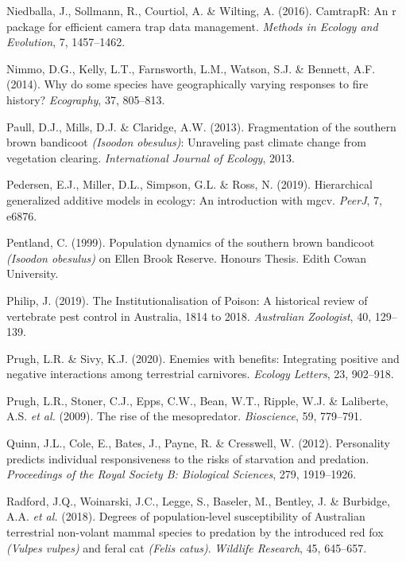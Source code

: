 \documentclass[11pt,a4paper,titlepage,twoside,openright]{style/unimelbthesis}
\begin{document}
\begin{mainmatter}
\leavevmode\hypertarget{ref-niedballa2016}{}%
Niedballa, J., Sollmann, R., Courtiol, A. \& Wilting, A. (2016). CamtrapR: An r package for efficient camera trap data management. \emph{Methods in Ecology and Evolution}, 7, 1457--1462.

\leavevmode\hypertarget{ref-nimmo2014why}{}%
Nimmo, D.G., Kelly, L.T., Farnsworth, L.M., Watson, S.J. \& Bennett, A.F. (2014). Why do some species have geographically varying responses to fire history? \emph{Ecography}, 37, 805--813.

\leavevmode\hypertarget{ref-paull2013fragmentation}{}%
Paull, D.J., Mills, D.J. \& Claridge, A.W. (2013). Fragmentation of the southern brown bandicoot \emph{(Isoodon obesulus)}: Unraveling past climate change from vegetation clearing. \emph{International Journal of Ecology}, 2013.

\leavevmode\hypertarget{ref-pedersen2019hierarchical}{}%
Pedersen, E.J., Miller, D.L., Simpson, G.L. \& Ross, N. (2019). Hierarchical generalized additive models in ecology: An introduction with mgcv. \emph{PeerJ}, 7, e6876.

\leavevmode\hypertarget{ref-pentland1999population}{}%
Pentland, C. (1999). Population dynamics of the southern brown bandicoot \emph{(Isoodon obesulus)} on Ellen Brook Reserve. Honours Thesis. Edith Cowan University.

\leavevmode\hypertarget{ref-philip2019institutionalisation}{}%
Philip, J. (2019). The Institutionalisation of Poison: A historical review of vertebrate pest control in Australia, 1814 to 2018. \emph{Australian Zoologist}, 40, 129--139.

\leavevmode\hypertarget{ref-prugh2020enemies}{}%
Prugh, L.R. \& Sivy, K.J. (2020). Enemies with benefits: Integrating positive and negative interactions among terrestrial carnivores. \emph{Ecology Letters}, 23, 902--918.

\leavevmode\hypertarget{ref-prugh2009rise}{}%
Prugh, L.R., Stoner, C.J., Epps, C.W., Bean, W.T., Ripple, W.J. \& Laliberte, A.S. \emph{et al.} (2009). The rise of the mesopredator. \emph{Bioscience}, 59, 779--791.

\leavevmode\hypertarget{ref-quinn2012personality}{}%
Quinn, J.L., Cole, E., Bates, J., Payne, R. \& Cresswell, W. (2012). Personality predicts individual responsiveness to the risks of starvation and predation. \emph{Proceedings of the Royal Society B: Biological Sciences}, 279, 1919--1926.

\leavevmode\hypertarget{ref-radford2018degrees}{}%
Radford, J.Q., Woinarski, J.C., Legge, S., Baseler, M., Bentley, J. \& Burbidge, A.A. \emph{et al.} (2018). Degrees of population-level susceptibility of Australian terrestrial non-volant mammal species to predation by the introduced red fox \emph{(Vulpes vulpes)} and feral cat \emph{(Felis catus)}. \emph{Wildlife Research}, 45, 645--657.


\end{mainmatter}
\end{document}
